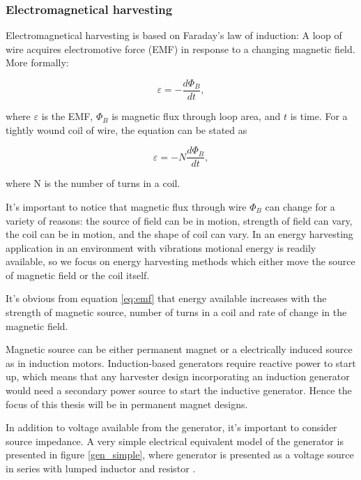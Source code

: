 \subsubsection{Electromagnetical harvesting}
Electromagnetical harvesting is based on Faraday's law of induction: A loop of wire acquires electromotive force (EMF) in response to a changing magnetic field. More formally:

\begin{equation}
  \varepsilon = - \frac{d \Phi_ {B}}{d t} , 
\end{equation}

where $\varepsilon$ is the EMF, $\Phi_{B}$ is magnetic flux through loop area, and $t$ is time. For a tightly wound coil of wire, the equation can be stated as 

\begin{equation} \label{eq:emf}
  \varepsilon = -N \frac{d \Phi_{B}}{d t} , 
\end{equation}

where N is the number of turns in a coil. \cite[p.999]{universityphysics}

It's important to notice that magnetic flux through wire $ \Phi_{B} $ can change for a variety of reasons: the source of field can be in motion, strength of field can vary, the coil can be in motion, and the shape of coil can vary. In an energy harvesting application in an environment with vibrations motional energy is readily available, so we focus on energy harvesting methods which either move the source of magnetic field or the coil itself.

It's obvious from equation \eqref{eq:emf} that energy available increases with the strength of magnetic source, number of turns in a coil and rate of change in the magnetic field. 

Magnetic source can be either permanent magnet or a electrically induced source as in induction motors. Induction-based generators require reactive power to start up, which means that any harvester design incorporating an induction generator would need a secondary power source to start the inductive generator. Hence the focus of this thesis will be in permanent magnet designs.

In addition to voltage available from the generator, it's important to consider source impedance. A very simple electrical equivalent model of the generator is presented in figure \ref{gen_simple}, where generator is presented as a voltage source in series with lumped inductor and resistor \cite{Jirutitijaroen2012}. 

